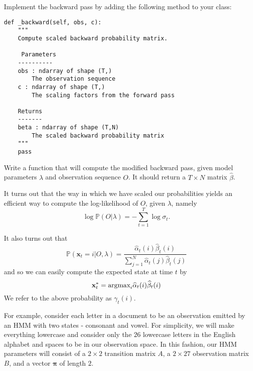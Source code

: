 \begin{problem}
Implement the backward pass by adding the following method to your class:
\begin{lstlisting}
def _backward(self, obs, c):
    """
    Compute scaled backward probability matrix.
    
     Parameters
    ----------
    obs : ndarray of shape (T,)
        The observation sequence
    c : ndarray of shape (T,)
        The scaling factors from the forward pass

    Returns
    -------
    beta : ndarray of shape (T,N)
        The scaled backward probability matrix
    """
    pass
\end{lstlisting}
\end{problem}


\begin{problem}
Write a function that will compute the modified backward pass, given model parameters $\lambda$ and observation sequence $O$. It should return a $T \times N$ matrix $\widehat{\beta}$.
\end{problem}

It turns out that the way in which we have scaled our probabilities yields an efficient way to compute the log-likelihood of $O$, given $\lambda$, namely
$$\log \mathbb{P}(O | \lambda) = - \sum_{t=1}^{T} \log \sigma_{t}.$$

It also turns out that
\begin{equation*}
\mathbb{P}(\mathbf{x}_{t} = i | O, \lambda) = \frac{\widehat{\alpha}_{t}(i)\widehat{\beta}_{t}(i)}{\sum_{j=1}^{N} \widehat{\alpha}_{t}(j)\widehat{\beta}_{t}(j)}
\end{equation*}
and so we can easily compute the expected state at time $t$ by
\begin{equation*}
\mathbf{x}_{t}^{*} = \mbox{argmax}_{i} \widehat{\alpha}_{t}(i) \widehat{\beta}_{t}(i)
\end{equation*}
We refer to the above probability as $\gamma_{t}(i)$.


For example, consider each letter in a document to be an observation emitted by an HMM with two states - consonant and vowel. For simplicity, we will make everything lowercase and consider only the $26$ lowercase letters in the English alphabet and spaces to be in our observation space. In this fashion, our HMM parameters will consist of a $2 \times 2$ transition matrix $A$, a $2 \times 27$ observation matrix $B$, and a vector $\mathbf{\pi}$ of length $2$.

